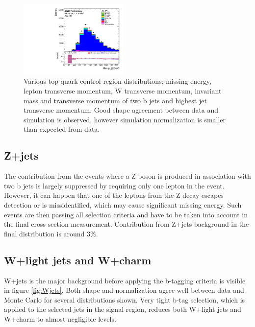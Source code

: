 \begin{figure}[htbp]
		\includegraphics[width=0.48\textwidth]{Figures/Results/Muon/prefit/TT_max_hJet_pt_doQCD1.pdf}		
	\caption[Top quark control region]{Various top quark control region distributions: missing energy, lepton transverse momentum, W transverse momentum, invariant mass and transverse momentum of two b jets and highest jet transverse momentum. Good shape agreement between data and simulation is observed, however simulation normalization is smaller than expected from data.}
	\label{fig:TT_CR}
\end{figure}

\subsection{Z+jets}

The contribution from the events where a Z boson is produced in association with two b jets is largely suppressed by requiring only one lepton in the event. However, it can happen that one of the leptons from the Z decay escapes detection or is missidentified, which may cause significant missing energy. Such events are then passing all selection criteria and have to be taken into account in the final cross section measurement. Contribution from Z+jets background in the final distribution is around 3\%.

\subsection{W+light jets and W+charm}

W+jets is the major background before applying the b-tagging criteria is visible in figure \ref{fig:Wjets}. Both shape and normalization agree well between data and Monte Carlo for several distributions shown. Very tight b-tag selection, which is applied to the selected jets in the signal region, reduces both W+light jets and W+charm to almost negligible levels.  

